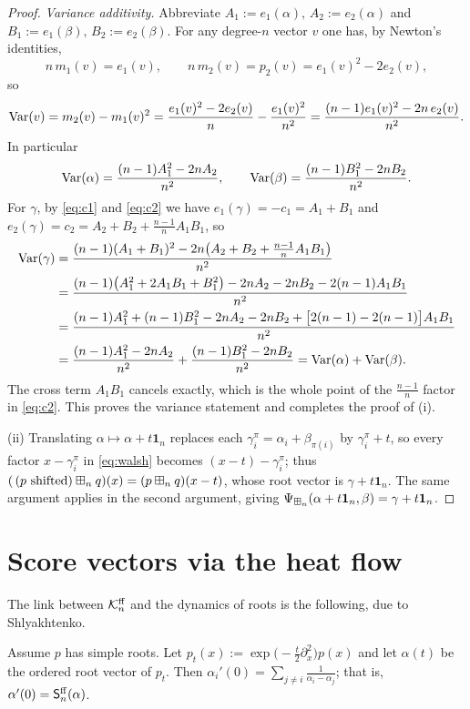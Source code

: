 \begin{proof}
\smallskip\noindent\emph{Variance additivity.}
Abbreviate $A_1:=e_1(\alpha),\,A_2:=e_2(\alpha)$ and $B_1:=e_1(\beta),\,B_2:=e_2(\beta)$.
For any degree-$n$ vector $v$ one has, by Newton's identities,
\[
n\,m_1(v)=e_1(v),\qquad n\,m_2(v)=p_2(v)=e_1(v)^2-2e_2(v),
\]
so
\[
\operatorname{Var}(v)=m_2(v)-m_1(v)^2=\frac{e_1(v)^2-2e_2(v)}{n}-\frac{e_1(v)^2}{n^2}
=\frac{(n-1)e_1(v)^2-2n\,e_2(v)}{n^2}.
\]
In particular
\[
\operatorname{Var}(\alpha)=\frac{(n-1)A_1^2-2nA_2}{n^2},\qquad
\operatorname{Var}(\beta)=\frac{(n-1)B_1^2-2nB_2}{n^2}.
\]
For $\gamma$, by \eqref{eq:c1} and \eqref{eq:c2} we have
$e_1(\gamma)=-c_1=A_1+B_1$ and $e_2(\gamma)=c_2=A_2+B_2+\tfrac{n-1}{n}A_1B_1$, so
\begin{align*}
\operatorname{Var}(\gamma)
&=\frac{(n-1)(A_1+B_1)^2-2n\bigl(A_2+B_2+\tfrac{n-1}{n}A_1B_1\bigr)}{n^2}\\
&=\frac{(n-1)\bigl(A_1^2+2A_1B_1+B_1^2\bigr)-2nA_2-2nB_2-2(n-1)A_1B_1}{n^2}\\
&=\frac{(n-1)A_1^2+(n-1)B_1^2-2nA_2-2nB_2
+\bigl[2(n-1)-2(n-1)\bigr]A_1B_1}{n^2}\\
&=\frac{(n-1)A_1^2-2nA_2}{n^2}+\frac{(n-1)B_1^2-2nB_2}{n^2}
=\operatorname{Var}(\alpha)+\operatorname{Var}(\beta).
\end{align*}
The cross term $A_1B_1$ cancels exactly, which is the whole point of the
$\tfrac{n-1}{n}$ factor in \eqref{eq:c2}. This proves the variance statement and
completes the proof of (i).

\smallskip\noindent
(ii) Translating $\alpha\mapsto\alpha+t\mathbf 1_n$ replaces each
$\gamma_i^\pi=\alpha_i+\beta_{\pi(i)}$ by $\gamma_i^\pi+t$, so every factor
$x-\gamma_i^\pi$ in \eqref{eq:walsh} becomes $(x-t)-\gamma_i^\pi$; thus
$(\,(p\text{ shifted})\boxplus_n q)(x)=(p\boxplus_n q)(x-t)$, whose root vector is
$\gamma+t\mathbf 1_n$. The same argument applies in the second argument, giving
$\Psi_{\boxplus_n}(\alpha+t\mathbf 1_n,\beta)=\gamma+t\mathbf 1_n$.
\end{proof}

\section*{Score vectors via the heat flow}

The link between $\mathcal{K}^{\mathrm{ff}}_n$ and the dynamics of roots is the following, due to
Shlyakhtenko.

\begin{qfourlemma}\label{lem:heat}
Assume $p$ has simple roots. Let $p_t(x):=\exp\!\bigl(-\tfrac{t}{2}\partial_x^2\bigr)p(x)$
and let $\alpha(t)$ be the ordered root vector of $p_t$. Then
$\alpha_i'(0)=\sum_{j\ne i}\frac{1}{\alpha_i-\alpha_j}$; that is,
$\alpha'(0)=\mathsf{S}^{\mathrm{ff}}_n(\alpha)$.
\end{qfourlemma}

